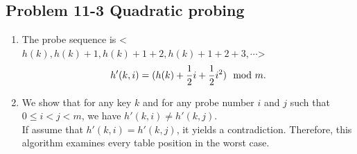 \subsection*{Problem 11-3 Quadratic probing}
\begin{enumerate}
	\item	The probe sequence is <$h(k), h(k) + 1, h(k) + 1 + 2, h(k) + 1 + 2 + 3, \cdots$>
		\begin{equation} \notag
			h'(k, i) = (h(k) + \frac{1}{2} i + \frac{1}{2} i^2) \mod m.
		\end{equation}
	\item	We show that for any key $k$ and for any probe number $i$ and $j$ such that $0 \leq i < j < m$, we have $h'(k, i) \neq h'(k, j)$. \\
		If assume that $h'(k, i) = h'(k, j)$, it yields a contradiction.
		Therefore, this algorithm examines every table position in the worst case.
\end{enumerate}

